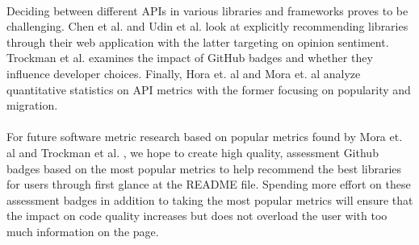 \documentclass[12pt]{article}
\begin{document}
\paragraph{}
Deciding between different APIs in various libraries and frameworks proves to be challenging. 
Chen et al. \cite{analogical} and Udin et al. \cite{opinerarticle} look at explicitly recommending libraries through their web application with the latter targeting on opinion sentiment. 
Trockman et al. \cite{githubbadges} examines the impact of GitHub \cite{github} badges and whether they influence developer choices.
Finally, Hora et. al \cite{apiwave} and Mora et. al \cite{metrics} analyze quantitative statistics on API metrics with the former focusing on popularity and migration.

\paragraph{}
For future software metric research based on popular metrics found by Mora et. al \cite{metrics}
and Trockman et al. \cite{githubbadges}, we hope to create high quality, assessment Github \cite{github} badges
based on the most popular metrics to help recommend the best libraries for users through first
glance at the README file. Spending more effort on these assessment badges in addition to taking the most popular metrics 
will ensure that the impact on code quality increases
but does not overload the user with too much information on the page. 

\newpage


\end{document}
